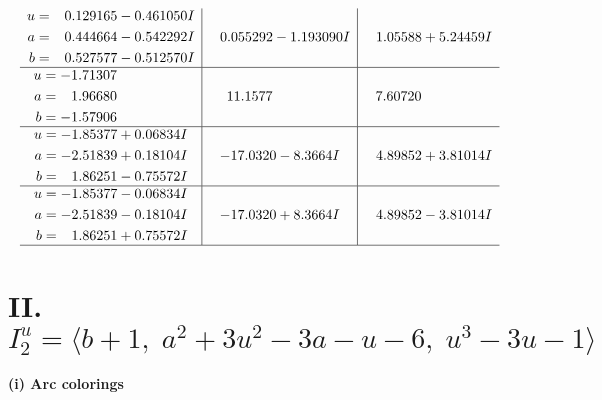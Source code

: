 \documentclass[1p]{elsarticle_modified}
\theoremstyle{definition}
\begin{document}
$$\begin{array}{c|c|c}
\begin{aligned}
u &= \phantom{-}0.129165 - 0.461050 I \\
a &= \phantom{-}0.444664 - 0.542292 I \\
b &= \phantom{-}0.527577 - 0.512570 I\end{aligned}
 & \phantom{-}0.055292 - 1.193090 I & \phantom{-}1.05588 + 5.24459 I \\ \hline\begin{aligned}
u &= -1.71307\phantom{ +0.000000I} \\
a &= \phantom{-}1.96680\phantom{ +0.000000I} \\
b &= -1.57906\phantom{ +0.000000I}\end{aligned}
 & \phantom{-}11.1577\phantom{ +0.000000I} & \phantom{-}7.60720\phantom{ +0.000000I} \\ \hline\begin{aligned}
u &= -1.85377 + 0.06834 I \\
a &= -2.51839 + 0.18104 I \\
b &= \phantom{-}1.86251 - 0.75572 I\end{aligned}
 & -17.0320 - 8.3664 I & \phantom{-}4.89852 + 3.81014 I \\ \hline\begin{aligned}
u &= -1.85377 - 0.06834 I \\
a &= -2.51839 - 0.18104 I \\
b &= \phantom{-}1.86251 + 0.75572 I\end{aligned}
 & -17.0320 + 8.3664 I & \phantom{-}4.89852 - 3.81014 I\\
 \hline 
 \end{array}$$\newpage\newpage\renewcommand{\arraystretch}{1}
\centering \section*{II. $I^u_{2}= \langle b+1,\;a^2+3 u^2-3 a- u-6,\;u^3-3 u-1 \rangle$}
\flushleft \textbf{(i) Arc colorings}\\
\end{document}
